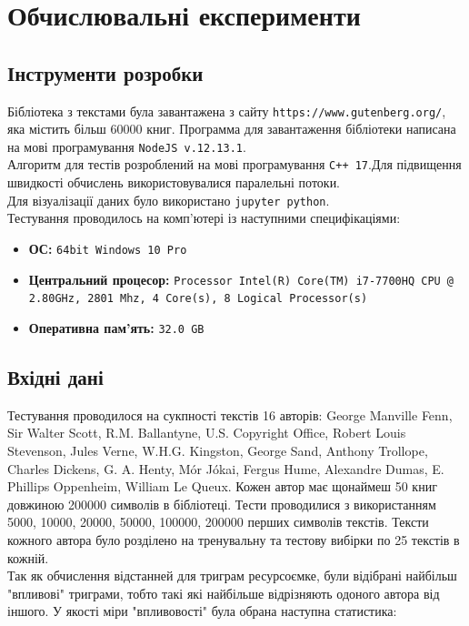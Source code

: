 \documentclass[12pt, a4paper]{extarticle}
\begin{document}
\newpage
\section{Обчислювальні експерименти}
\subsection{Інструменти розробки}

Бібліотека з текстами була завантажена з сайту \texttt{https://www.gutenberg.org/}, яка містить більш 60000 книг. Программа для завантаження бібліотеки написана на мові програмування \texttt{NodeJS v.12.13.1}.\\
Алгоритм для тестів розроблений на мові програмування \texttt{C++ 17}.Для підвищення швидкості обчислень використовувалися паралельні потоки.\\
Для візуалізації даних було використано \texttt{jupyter python}.\\
Тестування проводилось на комп'ютері із наступними специфікаціями:
\begin{itemize}
	\item \textbf{ОС:} \texttt{64bit Windows 10 Pro}
	\item \textbf{Центральний процесор:} \texttt{Processor	Intel(R) Core(TM) i7-7700HQ CPU @ 2.80GHz, 2801 Mhz, 4 Core(s), 8 Logical Processor(s)}
	\item \textbf{Оперативна пам'ять:} \texttt{32.0 GB}
\end{itemize}

\subsection{Вхідні дані}
Тестування проводилося на сукпності текстів 16 авторів: George Manville Fenn, Sir Walter Scott, R.M. Ballantyne, U.S. Copyright Office, Robert Louis Stevenson, Jules Verne, W.H.G. Kingston, George Sand, 
Anthony Trollope, Charles Dickens, G. A. Henty, Mór Jókai, Fergus Hume, Alexandre Dumas, E. Phillips Oppenheim, William Le Queux. Кожен автор має щонаймеш 50 книг довжиною 200000 символів в бібліотеці. Тести проводилися з використанням 5000, 10000, 20000, 50000, 100000, 200000 перших символів текстів. Тексти кожного автора було розділено на тренувальну та тестову вибірки по 25 текстів в кожній.\\
Так як обчислення відстанней для триграм ресурсоємке, були відібрані найбільш "впливові" триграми, тобто такі які найбільше відрізняють одоного автора від іншого. У якості міри "впливовості" була обрана наступна статистика:
\end{document}
